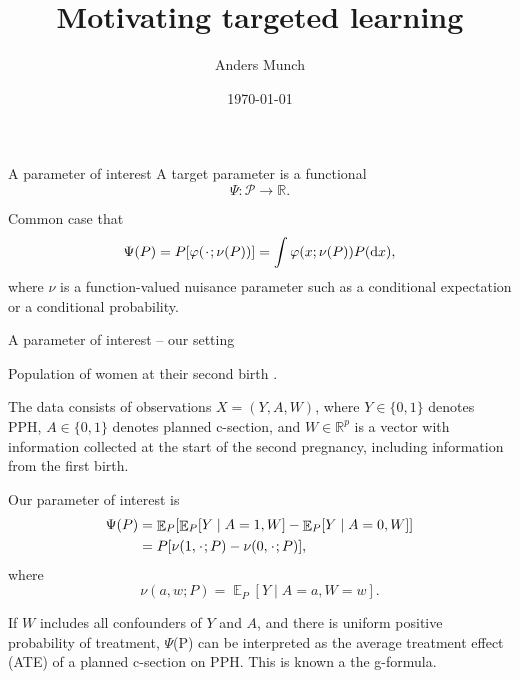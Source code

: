 \documentclass[smaller]{beamer}\usepackage{listings}
\author{Anders Munch}
\date{\today}
\title{Motivating targeted learning}
\newcommand{\E}{{\ensuremath{\mathop{{\mathbb{E}}}}}}
\newcommand{\R}{\mathbb{R}}
\newcommand{\blank}{\makebox[1ex]{\textbf{$\cdot$}}}
\renewcommand{\phi}{\varphi}
\newcommand*\diff{\mathop{}\!\mathrm{d}}
\newcommand{\1}{\mathds{1}}
\begin{document}
\maketitle

\begin{frame}[label={sec:org10f51db}]{A parameter of interest}
A target parameter is a functional
\begin{equation*}
  \Psi \colon \mathcal{P} \longrightarrow \R.
\end{equation*}

\vfill

Common case that
\begin{equation*}
  \Psi(P) = P{[ \phi(\blank; \nu(P)) ]}
  = \int \phi(x; \nu(P)) P(\diff x),
\end{equation*}
where $\nu$ is a function-valued nuisance parameter such as a conditional expectation or
a conditional probability.
\end{frame}


\begin{frame}[label={sec:orga8b9b09}]{A parameter of interest -- our setting}
\small

Population of women at their second birth \citep{wikkelso2014prediction}.

\vfill

The data consists of observations \( X = (Y, A, W) \), where \( Y \in \{0,1\}\) denotes PPH,
\( A \in \{0,1\} \) denotes planned c-section, and \( W \in \R^p \) is a vector
with information collected at the start of the second pregnancy, including
information from the first birth.

\vfill

Our parameter of interest is
\begin{align*}
  \Psi(P)
  & =
    \E_P
    {\left[
    \E_P{\left[ Y \mid A=1, W  \right]}
    - \E_P{\left[ Y \mid A=0, W  \right]}
    \right]}
  \\
  & = 
    P{[\nu(1, \blank; P) - \nu(0, \blank; P)]}    ,
\end{align*}
where
\begin{equation*}
  \nu(a, w; P) = \E_P{\left[ Y \mid A=a, W=w  \right]}.
\end{equation*}

\vfill

If \color{bblue}\(W\) includes all confounders of \(Y\) and \(A\)\color{black},
and there is \color{bblue}uniform positive probability of
treatment\color{black}, \(\Psi\)(P) can be interpreted as the average treatment
effect (ATE) of a planned c-section on PPH. This is known a the g-formula.
\end{frame}
\end{document}
